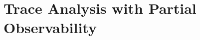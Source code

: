 \documentclass[conference]{IEEEtran}
\begin{document}




\section{Trace Analysis with Partial Observability}


\end{document}
